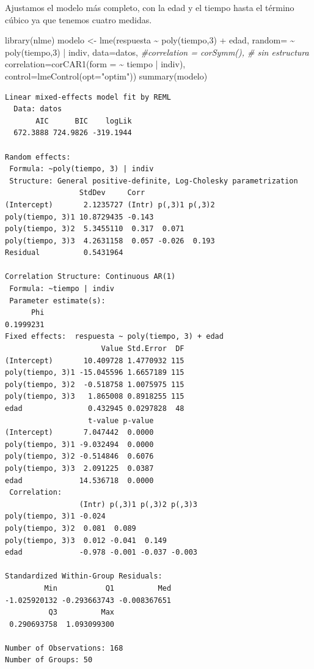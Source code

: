 \documentclass[
]{book}
\newenvironment{Shaded}{\begin{snugshade}}{\end{snugshade}}
\newcommand{\AttributeTok}[1]{\textcolor[rgb]{0.77,0.63,0.00}{#1}}
\newcommand{\CommentTok}[1]{\textcolor[rgb]{0.56,0.35,0.01}{\textit{#1}}}
\newcommand{\DecValTok}[1]{\textcolor[rgb]{0.00,0.00,0.81}{#1}}
\newcommand{\FunctionTok}[1]{\textcolor[rgb]{0.00,0.00,0.00}{#1}}
\newcommand{\NormalTok}[1]{#1}
\newcommand{\OtherTok}[1]{\textcolor[rgb]{0.56,0.35,0.01}{#1}}
\newcommand{\SpecialCharTok}[1]{\textcolor[rgb]{0.00,0.00,0.00}{#1}}
\newcommand{\StringTok}[1]{\textcolor[rgb]{0.31,0.60,0.02}{#1}}
\begin{document}
Ajustamos el modelo más completo, con la edad y el tiempo hasta el término cúbico ya que tenemos cuatro medidas.

\begin{Shaded}
\begin{Highlighting}[]
\FunctionTok{library}\NormalTok{(nlme)}
\NormalTok{modelo }\OtherTok{\textless{}{-}} \FunctionTok{lme}\NormalTok{(respuesta }\SpecialCharTok{\textasciitilde{}} \FunctionTok{poly}\NormalTok{(tiempo,}\DecValTok{3}\NormalTok{) }\SpecialCharTok{+}\NormalTok{ edad, }
              \AttributeTok{random=} \SpecialCharTok{\textasciitilde{}} \FunctionTok{poly}\NormalTok{(tiempo,}\DecValTok{3}\NormalTok{) }\SpecialCharTok{|}\NormalTok{ indiv, }
              \AttributeTok{data=}\NormalTok{datos, }
              \CommentTok{\#correlation = corSymm(), \# sin estructura}
              \AttributeTok{correlation=}\FunctionTok{corCAR1}\NormalTok{(}\AttributeTok{form =} \SpecialCharTok{\textasciitilde{}}\NormalTok{ tiempo }\SpecialCharTok{|}\NormalTok{ indiv),}
              \AttributeTok{control=}\FunctionTok{lmeControl}\NormalTok{(}\AttributeTok{opt=}\StringTok{"optim"}\NormalTok{))}
\FunctionTok{summary}\NormalTok{(modelo)}
\end{Highlighting}
\end{Shaded}

\begin{verbatim}
Linear mixed-effects model fit by REML
  Data: datos 
       AIC      BIC    logLik
  672.3888 724.9826 -319.1944

Random effects:
 Formula: ~poly(tiempo, 3) | indiv
 Structure: General positive-definite, Log-Cholesky parametrization
                 StdDev     Corr                
(Intercept)       2.1235727 (Intr) p(,3)1 p(,3)2
poly(tiempo, 3)1 10.8729435 -0.143              
poly(tiempo, 3)2  5.3455110  0.317  0.071       
poly(tiempo, 3)3  4.2631158  0.057 -0.026  0.193
Residual          0.5431964                     

Correlation Structure: Continuous AR(1)
 Formula: ~tiempo | indiv 
 Parameter estimate(s):
      Phi 
0.1999231 
Fixed effects:  respuesta ~ poly(tiempo, 3) + edad 
                      Value Std.Error  DF
(Intercept)       10.409728 1.4770932 115
poly(tiempo, 3)1 -15.045596 1.6657189 115
poly(tiempo, 3)2  -0.518758 1.0075975 115
poly(tiempo, 3)3   1.865008 0.8918255 115
edad               0.432945 0.0297828  48
                   t-value p-value
(Intercept)       7.047442  0.0000
poly(tiempo, 3)1 -9.032494  0.0000
poly(tiempo, 3)2 -0.514846  0.6076
poly(tiempo, 3)3  2.091225  0.0387
edad             14.536718  0.0000
 Correlation: 
                 (Intr) p(,3)1 p(,3)2 p(,3)3
poly(tiempo, 3)1 -0.024                     
poly(tiempo, 3)2  0.081  0.089              
poly(tiempo, 3)3  0.012 -0.041  0.149       
edad             -0.978 -0.001 -0.037 -0.003

Standardized Within-Group Residuals:
         Min           Q1          Med 
-1.025920132 -0.293663743 -0.008367651 
          Q3          Max 
 0.290693758  1.093099300 

Number of Observations: 168
Number of Groups: 50 
\end{verbatim}
\end{document}
